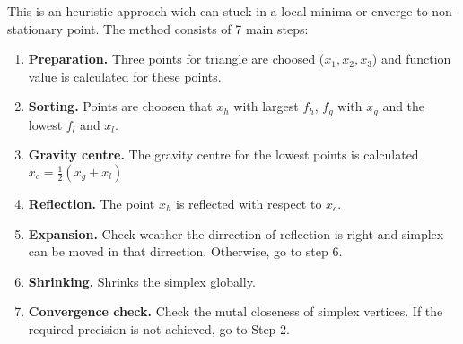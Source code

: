 This is an heuristic approach wich can stuck in a local minima or cnverge to non-stationary point.
The method consists of 7 main steps:
\begin{enumerate}
    \item \textbf{Preparation.} Three points for triangle are choosed ($x_1, x_2, x_3$) and function value is calculated for these points.
    \item \textbf{Sorting.} Points are choosen that $x_h$ with largest $f_h$, $f_g$ with $x_g$ and the lowest $f_l$ and $x_l$.
    \item \textbf{Gravity centre.} The gravity centre for the lowest points is calculated $x_c = \frac{1}{2}(x_g + x_l)$
    \item \textbf{Reflection.} The point $x_h$ is reflected with respect to $x_c$.
    \item \textbf{Expansion.} Check weather the dirrection of reflection is right and simplex can be moved in that dirrection. Otherwise, go to step 6.
    \item \textbf{Shrinking.} Shrinks the simplex globally.
    \item \textbf{Convergence check.} Check the mutal closeness of simplex vertices. If the required precision is not achieved, go to Step 2.
\end{enumerate}